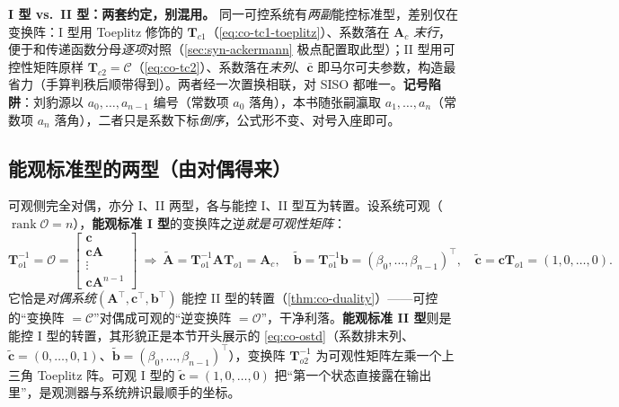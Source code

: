 \begin{insight}
\textbf{I 型 vs.\ II 型：两套约定，别混用。}\;
同一可控系统有\emph{两副}能控标准型，差别仅在变换阵：I 型用 Toeplitz 修饰的 $\mathbf{T}_{c1}$（\cref{eq:co-tc1-toeplitz}）、系数落在 $\mathbf{A}_c$ \emph{末行}，便于和传递函数分母\emph{逐项}对照（\cref{sec:syn-ackermann} 极点配置取此型）；II 型用可控性矩阵原样 $\mathbf{T}_{c2}=\mathcal{C}$（\cref{eq:co-tc2}）、系数落在\emph{末列}、$\bar{\mathbf{c}}$ 即马尔可夫参数，构造最省力（手算判秩后顺带得到）。两者经一次置换相联，对 SISO 都唯一。\textbf{记号陷阱}：刘豹源以 $a_0,\dots,a_{n-1}$ 编号（常数项 $a_0$ 落角），本书随张嗣瀛取 $a_1,\dots,a_n$（常数项 $a_n$ 落角），二者只是系数下标\emph{倒序}，公式形不变、对号入座即可。
\end{insight}

\subsection{能观标准型的两型（由对偶得来）}
\label{sec:co-canon-obs}

可观侧完全对偶，亦分 I、II 两型，各与能控 I、II 型互为转置\cite{liubao2006modern}。设系统可观（$\operatorname{rank}\mathcal{O}=n$），\textbf{能观标准 I 型}的变换阵之逆\emph{就是可观性矩阵}：
\begin{equation}
  \mathbf{T}_{o1}^{-1}=\mathcal{O}=\begin{bmatrix}\mathbf{c}\\ \mathbf{c}\mathbf{A}\\ \vdots\\ \mathbf{c}\mathbf{A}^{n-1}\end{bmatrix}
  \ \Longrightarrow\
  \tilde{\mathbf{A}}=\mathbf{T}_{o1}^{-1}\mathbf{A}\mathbf{T}_{o1}=\mathbf{A}_c,\quad
  \tilde{\mathbf{b}}=\mathbf{T}_{o1}^{-1}\mathbf{b}=(\beta_0,\dots,\beta_{n-1})^\top,\quad
  \tilde{\mathbf{c}}=\mathbf{c}\mathbf{T}_{o1}=(1,0,\dots,0).
  \label{eq:co-to1}
\end{equation}
它恰是\emph{对偶系统}$(\mathbf{A}^\top,\mathbf{c}^\top,\mathbf{b}^\top)$ 能控 II 型的转置（\cref{thm:co-duality}）——可控的“变换阵 $=\mathcal{C}$”对偶成可观的“逆变换阵 $=\mathcal{O}$”，干净利落。\textbf{能观标准 II 型}则是能控 I 型的转置，其形貌正是本节开头展示的 \cref{eq:co-ostd}（系数排末列、$\tilde{\mathbf{c}}=(0,\dots,0,1)$、$\tilde{\mathbf{b}}=(\beta_0,\dots,\beta_{n-1})^\top$），变换阵 $\mathbf{T}_{o2}^{-1}$ 为可观性矩阵左乘一个上三角 Toeplitz 阵\cite{liubao2006modern}。可观 I 型的 $\tilde{\mathbf{c}}=(1,0,\dots,0)$ 把“第一个状态直接露在输出里”，是观测器与系统辨识最顺手的坐标。

